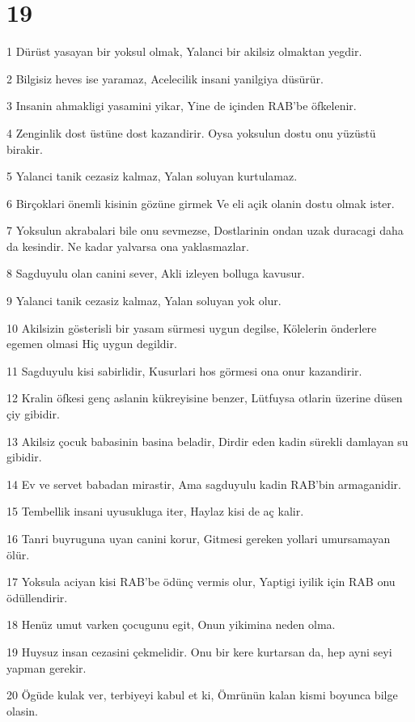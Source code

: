 \chapter{19}

\par 1 Dürüst yasayan bir yoksul olmak, Yalanci bir akilsiz olmaktan yegdir.
\par 2 Bilgisiz heves ise yaramaz, Acelecilik insani yanilgiya düsürür.
\par 3 Insanin ahmakligi yasamini yikar, Yine de içinden RAB'be öfkelenir.
\par 4 Zenginlik dost üstüne dost kazandirir. Oysa yoksulun dostu onu yüzüstü birakir.
\par 5 Yalanci tanik cezasiz kalmaz, Yalan soluyan kurtulamaz.
\par 6 Birçoklari önemli kisinin gözüne girmek Ve eli açik olanin dostu olmak ister.
\par 7 Yoksulun akrabalari bile onu sevmezse, Dostlarinin ondan uzak duracagi daha da kesindir. Ne kadar yalvarsa ona yaklasmazlar.
\par 8 Sagduyulu olan canini sever, Akli izleyen bolluga kavusur.
\par 9 Yalanci tanik cezasiz kalmaz, Yalan soluyan yok olur.
\par 10 Akilsizin gösterisli bir yasam sürmesi uygun degilse, Kölelerin önderlere egemen olmasi Hiç uygun degildir.
\par 11 Sagduyulu kisi sabirlidir, Kusurlari hos görmesi ona onur kazandirir.
\par 12 Kralin öfkesi genç aslanin kükreyisine benzer, Lütfuysa otlarin üzerine düsen çiy gibidir.
\par 13 Akilsiz çocuk babasinin basina beladir, Dirdir eden kadin sürekli damlayan su gibidir.
\par 14 Ev ve servet babadan mirastir, Ama sagduyulu kadin RAB'bin armaganidir.
\par 15 Tembellik insani uyusukluga iter, Haylaz kisi de aç kalir.
\par 16 Tanri buyruguna uyan canini korur, Gitmesi gereken yollari umursamayan ölür.
\par 17 Yoksula aciyan kisi RAB'be ödünç vermis olur, Yaptigi iyilik için RAB onu ödüllendirir.
\par 18 Henüz umut varken çocugunu egit, Onun yikimina neden olma.
\par 19 Huysuz insan cezasini çekmelidir. Onu bir kere kurtarsan da, hep ayni seyi yapman gerekir.
\par 20 Ögüde kulak ver, terbiyeyi kabul et ki, Ömrünün kalan kismi boyunca bilge olasin.
